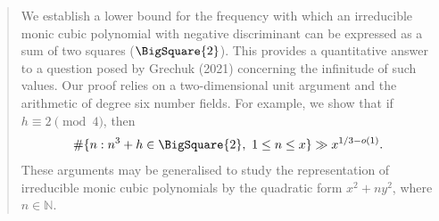 \documentclass[12pt]{amsart}
\newcommand{\1}{\mathmybb{1}}
\begin{document}
\begin{abstract}
We establish a lower bound for the frequency with which an irreducible monic cubic polynomial with negative discriminant can be expressed as a sum of two squares ($\BigSquare{2}$). This provides a quantitative answer to a question posed by Grechuk (2021) concerning the infinitude of such values. Our proof relies on a two-dimensional unit argument and the arithmetic of degree six number fields. For example, we show that if $h \equiv 2 \pmod{4}$, then
\begin{align*}
\# \{n : n^3+h \in \BigSquare{2}, \ 1 \leq n \leq x \} \gg x^{1/3-o(1)}.
\end{align*}
These arguments may be generalised to study the representation of irreducible monic cubic polynomials by the quadratic form $x^2+ny^2$, where $n \in \mathbb{N}$.
\end{abstract}


\maketitle

\tableofcontents
\end{document}
